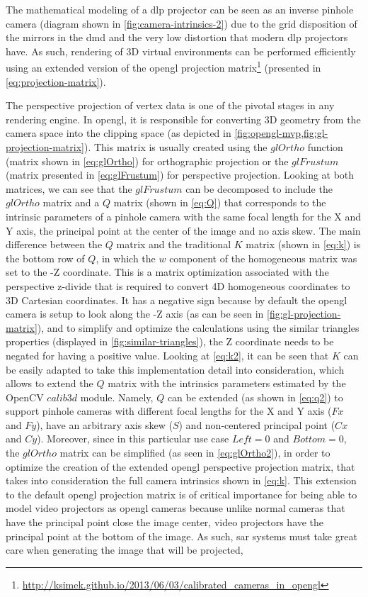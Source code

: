 The mathematical modeling of a \gls{dlp} projector can be seen as an inverse pinhole camera (diagram shown in \cref{fig:camera-intrinsics-2}) due to the grid disposition of the mirrors in the \gls{dmd} and the very low distortion that modern \gls{dlp} projectors have. As such, rendering of 3D virtual environments can be performed efficiently using an extended version of the \gls{opengl} projection matrix\footnote{\url{http://ksimek.github.io/2013/06/03/calibrated\_cameras\_in\_opengl}} (presented in \cref{eq:projection-matrix}).

The perspective projection of vertex data is one of the pivotal stages in any rendering engine. In \gls{opengl}, it is responsible for converting 3D geometry from the camera space into the clipping space (as depicted in \cref{fig:opengl-mvp,fig:gl-projection-matrix}). This matrix is usually created using the $glOrtho$ function (matrix shown in \cref{eq:glOrtho}) for orthographic projection or the $glFrustum$ (matrix presented in \cref{eq:glFrustum}) for perspective projection. Looking at both matrices, we can see that the $glFrustum$ can be decomposed to include the $glOrtho$ matrix and a $Q$ matrix (shown in \cref{eq:Q}) that corresponds to the intrinsic parameters of a pinhole camera with the same focal length for the X and Y axis, the principal point at the center of the image and no axis skew. The main difference between the $Q$ matrix and the traditional $K$ matrix \cite{Hartley2003} (shown in \cref{eq:k}) is the bottom row of $Q$, in which the $w$ component of the homogeneous matrix was set to the -Z coordinate. This is a matrix optimization associated with the perspective z-divide that is required to convert 4D homogeneous coordinates to 3D Cartesian coordinates. It has a negative sign because by default the \gls{opengl} camera is setup to look along the -Z axis (as can be seen in \cref{fig:gl-projection-matrix}), and to simplify and optimize the calculations using the similar triangles properties (displayed in \cref{fig:similar-triangles}), the Z coordinate needs to be negated for having a positive value. Looking at \cref{eq:k2}, it can be seen that $K$ can be easily adapted to take this implementation detail into consideration, which allows to extend the $Q$ matrix with the intrinsics parameters estimated by the OpenCV $calib3d$ module. Namely, $Q$ can be extended (as shown in \cref{eq:q2}) to support pinhole cameras with different focal lengths for the X and Y axis ($Fx$ and $Fy$), have an arbitrary axis skew ($S$) and non-centered principal point ($Cx$ and $Cy$). Moreover, since in this particular use case $Left=0$ and $Bottom=0$, the $glOrtho$ matrix can be simplified (as seen in \cref{eq:glOrtho2}), in order to optimize the creation of the extended \gls{opengl} perspective projection matrix, that takes into consideration the full camera intrinsics shown in \cref{eq:k}. This extension to the default \gls{opengl} projection matrix is of critical importance for being able to model video projectors as \gls{opengl} cameras because unlike normal cameras that have the principal point close the image center, video projectors have the principal point at the bottom of the image. As such, \gls{sar} systems must take great care when generating the image that will be projected, 